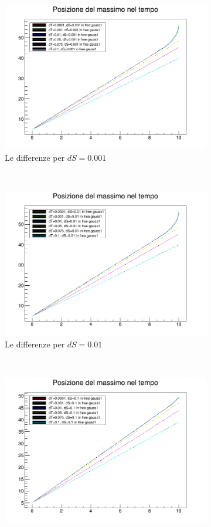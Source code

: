 \begin{figure}[htb]
	\centering
\begin{subfigure}[b]{0.3\textwidth}
\includegraphics[width=\textwidth]{IMG/v_g1_0001}
\caption[Differenze in 0.001]{Le differenze per $dS = 0.001$}
\end{subfigure}
~
\begin{subfigure}[b]{0.3\textwidth}
\includegraphics[width=\textwidth]{IMG/v_g1_001}
\caption[Differenze in 0.01]{Le differenze per $dS = 0.01$}
\end{subfigure}
~
\begin{subfigure}[b]{0.3\textwidth}
\includegraphics[width=\textwidth]{IMG/v_g1_01}

\end{subfigure}
\end{figure}
